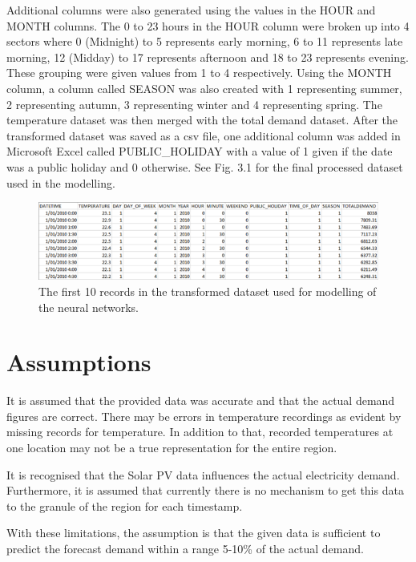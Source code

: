 \documentclass[mstat,12pt]{unswthesis}
\begin{document}
Additional columns were also generated using the values in the HOUR and
MONTH columns. The 0 to 23 hours in the HOUR column were broken up into
4 sectors where 0 (Midnight) to 5 represents early morning, 6 to 11
represents late morning, 12 (Midday) to 17 represents afternoon and 18
to 23 represents evening. These grouping were given values from 1 to 4
respectively. Using the MONTH column, a column called SEASON was also
created with 1 representing summer, 2 representing autumn, 3
representing winter and 4 representing spring. The temperature dataset
was then merged with the total demand dataset. After the transformed
dataset was saved as a csv file, one additional column was added in
Microsoft Excel called PUBLIC\_HOLIDAY with a value of 1 given if the
date was a public holiday and 0 otherwise. See Fig. 3.1 for the final
processed dataset used in the modelling.

\begin{figure}[H]
\includegraphics{first_10_records.png}
\caption{The first 10 records in the transformed dataset used for modelling of the neural networks.}\label{3.1}
\end{figure}

\hypertarget{assumptions}{%
\section{Assumptions}\label{assumptions}}

It is assumed that the provided data was accurate and that the actual
demand figures are correct. There may be errors in temperature
recordings as evident by missing records for temperature. In addition to
that, recorded temperatures at one location may not be a true
representation for the entire region.

\bigskip

It is recognised that the Solar PV data influences the actual
electricity demand. Furthermore, it is assumed that currently there is
no mechanism to get this data to the granule of the region for each
timestamp.

\bigskip

With these limitations, the assumption is that the given data is
sufficient to predict the forecast demand within a range 5-10\% of the
actual demand.
\end{document}
